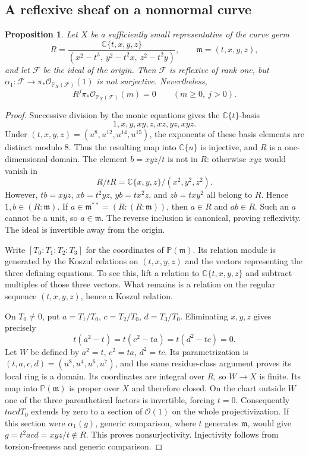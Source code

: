 \documentclass[11pt,reqno]{amsart}
\numberwithin{equation}{section}
\newtheorem{proposition}[theorem]{Proposition}
\theoremstyle{definition}
\theoremstyle{remark}
\newcommand{\OO}{\mathcal O}
\newcommand{\FF}{\mathcal F}
\newcommand{\PP}{\mathbb P}
\newcommand{\CC}{\mathbb C}
\begin{document}
\subsection{A reflexive sheaf on a nonnormal curve}
\begin{proposition}\label{prop:nonnormal}
Let $X$ be a sufficiently small representative of the curve germ
\[
 R=\frac{\CC\{t,x,y,z\}}{(x^2-t^3,\ y^2-t^2x,\ z^2-t^2y)},
 \qquad\mathfrak m=(t,x,y,z),
\]
and let $\FF$ be the ideal of the origin. Then $\FF$ is reflexive of rank one, but $\alpha_1:\FF\to\pi_*\OO_{\PP_X(\FF)}(1)$ is not surjective. Nevertheless,
\[
 R^j\pi_*\OO_{\PP_X(\FF)}(m)=0\qquad(m\geq0,\ j>0).
\]
\end{proposition}
\begin{proof}
Successive division by the monic equations gives the $\CC\{t\}$-basis
\[
 1,x,y,xy,z,xz,yz,xyz.
\]
Under $(t,x,y,z)=(u^8,u^{12},u^{14},u^{15})$, the exponents of these basis elements are distinct modulo $8$. Thus the resulting map into $\CC\{u\}$ is injective, and $R$ is a one-dimensional domain. The element $b=xyz/t$ is not in $R$: otherwise $xyz$ would vanish in
\[
 R/tR=\CC\{x,y,z\}/(x^2,y^2,z^2).
\]
However, $tb=xyz$, $xb=t^2yz$, $yb=tx^2z$, and $zb=txy^2$ all belong to $R$. Hence $1,b\in(R:\mathfrak m)$. If $a\in\mathfrak m^{**}=(R:(R:\mathfrak m))$, then $a\in R$ and $ab\in R$. Such an $a$ cannot be a unit, so $a\in\mathfrak m$. The reverse inclusion is canonical, proving reflexivity. The ideal is invertible away from the origin.

Write $[T_0:T_1:T_2:T_3]$ for the coordinates of $\PP(\mathfrak m)$. Its relation module is generated by the Koszul relations on $(t,x,y,z)$ and the vectors representing the three defining equations. To see this, lift a relation to $\CC\{t,x,y,z\}$ and subtract multiples of those three vectors. What remains is a relation on the regular sequence $(t,x,y,z)$, hence a Koszul relation.

On $T_0\neq0$, put $a=T_1/T_0$, $c=T_2/T_0$, $d=T_3/T_0$. Eliminating $x,y,z$ gives precisely
\[
 t(a^2-t)=t(c^2-ta)=t(d^2-tc)=0.
\]
Let $W$ be defined by $a^2=t$, $c^2=ta$, $d^2=tc$. Its parametrization is $(t,a,c,d)=(u^8,u^4,u^6,u^7)$, and the same residue-class argument proves its local ring is a domain. Its coordinates are integral over $R$, so $W\to X$ is finite. Its map into $\PP(\mathfrak m)$ is proper over $X$ and therefore closed. On the chart outside $W$ one of the three parenthetical factors is invertible, forcing $t=0$. Consequently $tacdT_0$ extends by zero to a section of $\OO(1)$ on the whole projectivization. If this section were $\alpha_1(g)$, generic comparison, where $t$ generates $\mathfrak m$, would give $g=t^2acd=xyz/t\notin R$. This proves nonsurjectivity. Injectivity follows from torsion-freeness and generic comparison.


\end{proof}
\end{document}
